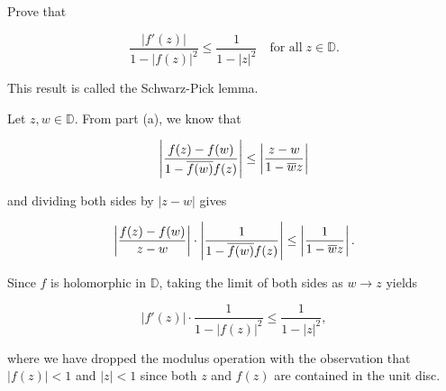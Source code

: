 Prove that

$$
\frac{|f'(z)|}{1 - |f(z)|^2} \le \frac{1}{1 - |z|^2} \quad \text{for all} \; z \in \mathbb{D}.
$$

This result is called the Schwarz-Pick lemma.

\begin{solution}
    Let $z, w \in \mathbb{D}$. From part (a), we know that


    $$
    \left|\frac{f(z) - f(w)}{1 - \overline{f(w)}{f(z)}} \right| \le \left|\frac{z - w}{1 - \overline{w}z} \right|
    $$

    and dividing both sides by $|z - w|$ gives

    $$
    \left|\frac{f(z) - f(w)}{z - w} \right| \cdot \left| \frac{1}{1 - \overline{f(w)}{f(z)}} \right| \le \left|\frac{1}{1 - \overline{w}z} \right|.
    $$

    Since $f$ is holomorphic in $\mathbb{D}$, taking the limit of both sides as $w \to z$ yields

    $$
    \left| f'(z) \right| \cdot \frac{1}{1 - |f(z)|^2} \le \frac{1}{1 - |z|^2},
    $$

    where we have dropped the modulus operation with the observation that $|f(z)| < 1$ and $|z| < 1$ since both
    $z$ and $f(z)$ are contained in the unit disc.
    \ \\
\end{solution}